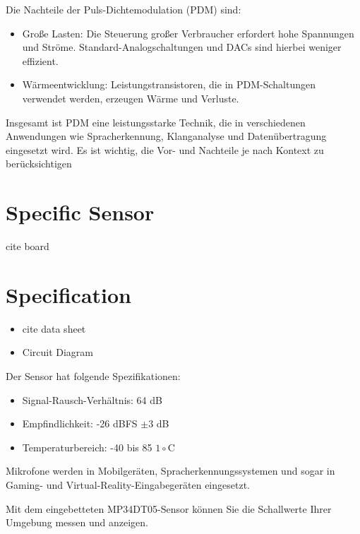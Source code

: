 \bigskip

Die Nachteile der Puls-Dichtemodulation (PDM) sind:

\begin{itemize}
    \item Große Lasten: Die Steuerung großer Verbraucher erfordert hohe Spannungen und Ströme. Standard-Analogschaltungen und DACs sind hierbei weniger effizient.
    \item Wärmeentwicklung: Leistungstransistoren, die in PDM-Schaltungen verwendet werden, erzeugen Wärme und Verluste.
\end{itemize}

Insgesamt ist PDM eine leistungsstarke Technik, die in verschiedenen Anwendungen wie Spracherkennung, Klanganalyse und Datenübertragung eingesetzt wird. Es ist wichtig, die Vor- und Nachteile je nach Kontext zu berücksichtigen



\section{Specific Sensor}

cite board

\section{Specification}

\begin{itemize}
    \item cite data sheet
    \item Circuit Diagram
\end{itemize}



 Der Sensor hat folgende Spezifikationen:
 
\begin{itemize}
  \item Signal-Rausch-Verhältnis: 64 dB
  \item Empfindlichkeit: -26 dBFS $\pm 3$ dB
  \item Temperaturbereich: -40 bis 85 $1\circ$C
\end{itemize}

Mikrofone werden in Mobilgeräten, Spracherkennungssystemen und sogar in Gaming- und Virtual-Reality-Eingabegeräten eingesetzt.

Mit dem eingebetteten MP34DT05-Sensor können Sie die Schallwerte Ihrer Umgebung messen und anzeigen.


